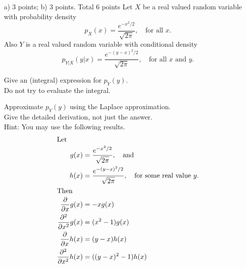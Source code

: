\documentclass[a4paper]{article}
\newcommand{\tjboxed}[1]{}
\begin{document}
\begin{exam}
\newcommand{\ddx}{\frac{\partial}{\partial x}}
\newcommand{\ddxsq}{\frac{\partial^2}{\partial x^2}}
\begin{vraag}{a) 3 points; b) 3 points. Total 6 points}
    Let $X$ be a real valued random variable with probability
    density
    \[ p_X(x) = \frac{e^{-x^2/2}}{\sqrt{2\pi}},\quad\text{for all $x$}. \]
    Also $Y$ is a real valued random variable with conditional
    density
    \[ p_{Y|X}(y|x) = \frac{e^{-(y-x)^2/2}}{\sqrt{2\pi}},\quad\text{for
    all $x$ and $y$}. \]
    \begin{deelvraag}
        Give an (integral) expression for $p_Y(y)$.\\
        Do not try to evaluate the integral.
        \tjboxed{%
            \[ p_Y(y) = \int_{-\infty}^{\infty} p_X(x)p_{Y|X}(y|x)\,dx =
                \int_{-\infty}^{\infty}
                \frac{e^{-\frac12(x^2+(y-x)^2)}}{2\pi}\,dx \]
        }
    \end{deelvraag}
    \begin{deelvraag}
        Approximate $p_Y(y)$ using the Laplace approximation.\\
        Give the detailed derivation, not just the answer.\\
        Hint: You may use the following results.
        \begin{align*}
          \intertext{Let}
          g(x) &= \frac{e^{-x^2/2}}{\sqrt{2\pi}},\quad\text{and} \\
          h(x) &= \frac{e^{-(y-x)^2/2}}{\sqrt{2\pi}},\quad\text{for some real value $y$.} \\
          \intertext{Then}
          \ddx g(x) &= -xg(x) \\
          \ddxsq g(x) &= (x^2-1)g(x) \\
          \ddx h(x) &= (y-x)h(x) \\
          \ddxsq h(x) &= ((y-x)^2-1)h(x) \\
        \end{align*}
        \tjboxed{%
        Using the hint we determine the first derivative of
        \begin{align*}
        	f(x) &= g(x)h(x), \\
        	\ddx f(x) &= \ddx g(x)\cdot h(x) = -xg(x)h(x)+g(x)(y-x)h(x) = (y-2x)f(x)\\
        	\intertext{Setting this to zero gives}
        	y-2x&= 0; \quad \text{so}\quad x=\frac12y. \\
        	\ddx \ln f(x) &= \frac{\ddx f(x)}{f(x)} = (y-2x) \\

\end{align*}}
\end{deelvraag}
\end{vraag}
\end{exam}
\end{document}
